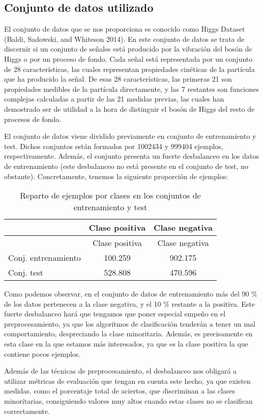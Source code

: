 \documentclass[
  a4paper,
,tablecaptionabove
]{scrartcl}
\begin{document}
\hypertarget{conjunto-de-datos-utilizado}{%
\subsection{Conjunto de datos
utilizado}\label{conjunto-de-datos-utilizado}}

El conjunto de datos que se nos proporciona es conocido como Higgs
Dataset (Baldi, Sadowski, and Whiteson 2014). En este conjunto de datos
se trata de discernir si un conjunto de señales está producido por la
vibración del bosón de Higgs o por un proceso de fondo. Cada señal está
representada por un conjunto de 28 características, las cuales
representan propiedades cinéticas de la partícula que ha producido la
señal. De esas 28 características, las primeras 21 son propiedades
medibles de la partícula directamente, y las 7 restantes son funciones
complejas calculadas a partir de las 21 medidas previas, las cuales han
demostrado ser de utilidad a la hora de distinguir el bosón de Higgs del
resto de procesos de fondo.

El conjunto de datos viene dividido previamente en conjunto de
entrenamiento y test. Dichos conjuntos están formados por 1002434 y
999404 ejemplos, respectivamente. Además, el conjunto presenta un fuerte
desbalanceo en los datos de entrenamiento (este desbalanceo no está
presente en el conjunto de test, no obstante). Concretamente, tenemos la
siguiente proporción de ejemplos:

\begin{longtable}[]{@{}lcc@{}}
\caption{Reparto de ejemplos por clases en los conjuntos de
entrenamiento y test}\tabularnewline
\toprule
& Clase positiva & Clase negativa\tabularnewline
\midrule
\endfirsthead
\toprule
& Clase positiva & Clase negativa\tabularnewline
\midrule
\endhead
Conj. entrenamiento & 100.259 & 902.175\tabularnewline
Conj. test & 528.808 & 470.596\tabularnewline
\bottomrule
\end{longtable}

Como podemos observar, en el conjunto de datos de entrenamiento más del
90 \% de los datos pertenecen a la clase negativa, y el 10 \% restante a
la positiva. Este fuerte desbalanceo hará que tengamos que poner
especial empeño en el preprocesamiento, ya que los algoritmos de
clasificación tenderán a tener un mal comportamiento, despreciando la
clase minoritaria. Además, es precisamente en esta clase en la que
estamos más interesados, ya que es la clase positiva la que contiene
pocos ejemplos.

Además de las técnicas de preprocesamiento, el desbalanceo nos obligará
a utilizar métricas de evaluación que tengan en cuenta este hecho, ya
que existen medidas, como el porcentaje total de aciertos, que
discriminan a las clases minoritarias, consiguiendo valores muy altos
cuando estas clases no se clasifican correctamente.
\end{document}
